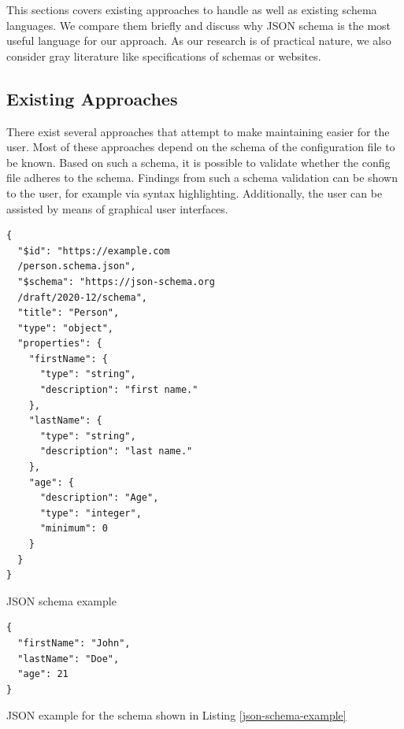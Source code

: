 
This sections covers existing approaches to handle \cfgfiles{} as well as existing schema languages.
We compare them briefly and discuss why JSON schema is the most useful language for our approach.
As our research is of practical nature, we also consider gray literature like specifications of schemas or websites.

\subsection{Existing Approaches}\label{subsec:existing-approaches}
There exist several approaches that attempt to make maintaining \cfgfiles{} easier for the user.
Most of these approaches depend on the schema of the configuration file to be known.
Based on such a schema, it is possible to validate whether the config file adheres to the schema.
Findings from such a schema validation can be shown to the user, for example via syntax highlighting.
Additionally, the user can be assisted by means of graphical user interfaces.

\begin{listing}[!h]
\begin{verbatim}
{
  "$id": "https://example.com
  /person.schema.json",
  "$schema": "https://json-schema.org
  /draft/2020-12/schema",
  "title": "Person",
  "type": "object",
  "properties": {
    "firstName": {
      "type": "string",
      "description": "first name."
    },
    "lastName": {
      "type": "string",
      "description": "last name."
    },
    "age": {
      "description": "Age",
      "type": "integer",
      "minimum": 0
    }
  }
}
\end{verbatim}
\caption{JSON schema example} 
\label{json-schema-example}
\end{listing}


\begin{listing}[!h]
\begin{verbatim}
{
  "firstName": "John",
  "lastName": "Doe",
  "age": 21
}
\end{verbatim}
\caption{JSON example for the schema shown in Listing \ref{json-schema-example}} 
\label{json-example}
\end{listing}


